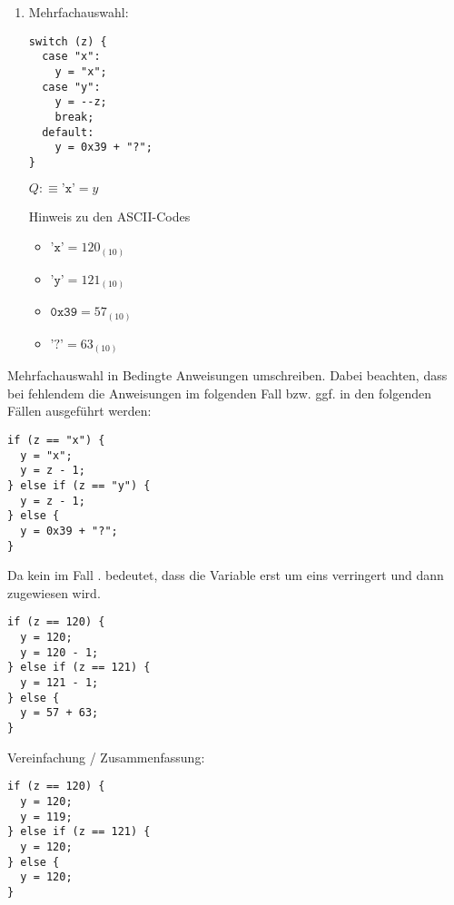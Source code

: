 \documentclass{lehramt-informatik-aufgabe}
\begin{document}
\begin{enumerate}
\begin{liAntwort}
\end{liAntwort}

%

\item Mehrfachauswahl:

\begin{verbatim}
switch (z) {
  case "x":
    y = "x";
  case "y":
    y = --z;
    break;
  default:
    y = 0x39 + "?";
}
\end{verbatim}

$Q :\equiv \texttt{'x'} = y$

Hinweis zu den ASCII-Codes

\begin{itemize}
\item $\texttt{'x'} = 120_{(10)}$
\item $\texttt{'y'} = 121_{(10)}$
\item $\texttt{0x39} = 57_{(10)}$
\item $\texttt{'?'} = 63_{(10)}$
\end{itemize}

\end{enumerate}

\begin{liAntwort}
Mehrfachauswahl in Bedingte Anweisungen umschreiben. Dabei beachten,
dass bei fehlendem  die Anweisungen im folgenden Fall
bzw. ggf. in den folgenden Fällen ausgeführt werden:

\begin{verbatim}
if (z == "x") {
  y = "x";
  y = z - 1;
} else if (z == "y") {
  y = z - 1;
} else {
  y = 0x39 + "?";
}
\end{verbatim}

\noindent
Da kein  im Fall .
 bedeutet, dass die Variable erst um eins verringert und
dann zugewiesen wird.

\begin{verbatim}
if (z == 120) {
  y = 120;
  y = 120 - 1;
} else if (z == 121) {
  y = 121 - 1;
} else {
  y = 57 + 63;
}
\end{verbatim}

\noindent
Vereinfachung / Zusammenfassung:

\begin{verbatim}
if (z == 120) {
  y = 120;
  y = 119;
} else if (z == 121) {
  y = 120;
} else {
  y = 120;
}
\end{verbatim}
\end{liAntwort}
\end{document}
